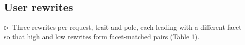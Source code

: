 \documentclass[11pt]{article}
\newcommand{\flow}[1]{\par\noindent\textcolor{blue!60!black}{\small$\triangleright$\ #1}\par\medskip}
\begin{document}
\subsection{User rewrites}
\flow{Three rewrites per request, trait and pole, each leading with a different facet so that high and low rewrites form facet-matched pairs (Table 1).}
\end{document}
